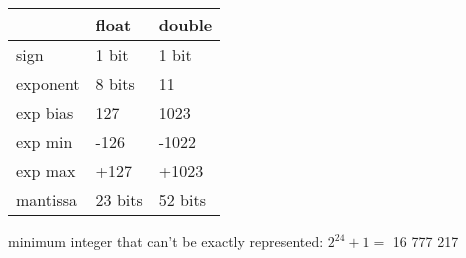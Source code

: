 \documentclass[12pt]{article}
\begin{document}
\begin{spacing}{0.9}
\begin{multicols*}{2}
\begin{flushleft}
\begin{outline}[longenum]
\begin{tabular}{|l l l|}
    $ $      & float   & double  \\ \hline
    sign     & 1 bit   & 1 bit   \\ \hline
    exponent & 8 bits  & 11      \\ \hline
    exp bias & 127     & 1023    \\ \hline
    exp min  & -126    & -1022   \\ \hline
    exp max  & +127    & +1023   \\ \hline
    mantissa & 23 bits & 52 bits \\ \hline
  \end{tabular}
  \1 minimum integer that can't be exactly represented: $2^{24} + 1 = $ 16 777 217 

\end{outline}
\end{flushleft}
\end{multicols*}
\end{spacing}
\end{document}
